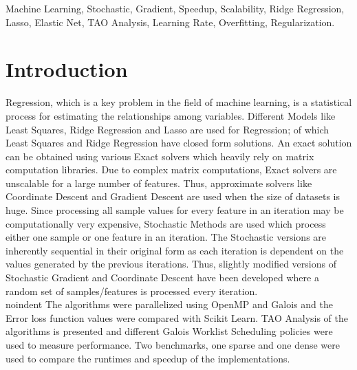 \documentclass{sigplanconf}
\begin{document}
\keywords
Machine Learning, Stochastic, Gradient, Speedup, Scalability, Ridge Regression, Lasso, Elastic Net, TAO Analysis, Learning Rate, Overfitting, 
Regularization.

\section{Introduction}
Regression, which is a key problem in the field of machine learning, is a statistical process for estimating the relationships among variables. 
Different Models like Least Squares, Ridge Regression and Lasso are used for Regression; of which Least Squares and Ridge Regression have
closed form solutions. An exact solution can be obtained using various Exact solvers which heavily rely on matrix computation libraries. 
Due to complex matrix computations, Exact solvers are unscalable for a large number of features. Thus, approximate solvers like Coordinate Descent 
and Gradient Descent are used when the size of datasets is huge. Since processing all sample values for every feature in an iteration may be computationally
very expensive, Stochastic Methods are used which process either one sample or one feature in an iteration. The Stochastic versions are inherently
sequential in their original form as each iteration is dependent on the values generated by the previous iterations. Thus, slightly modified
versions of Stochastic Gradient and Coordinate Descent have been developed where a random set of samples/features is processed every iteration.\\

{noindent}
The algorithms were parallelized using OpenMP and Galois and the Error loss function values were compared with Scikit Learn. TAO Analysis
of the algorithms is presented and different Galois Worklist Scheduling policies were used to measure performance. Two benchmarks, one sparse and one 
dense were used to compare the runtimes and speedup of the implementations.
\end{document}
